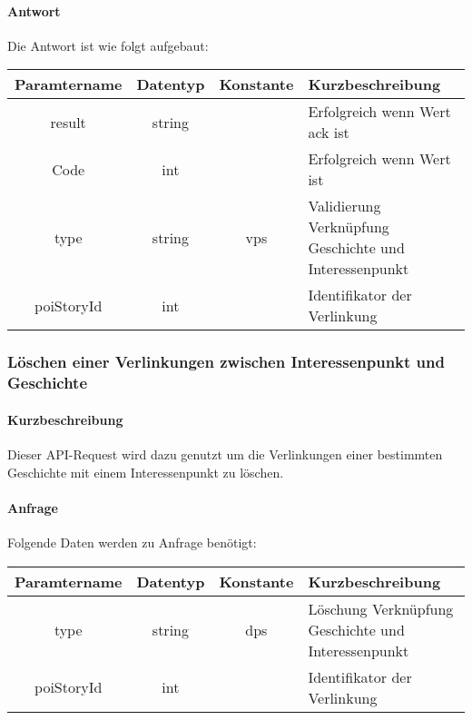 \paragraph{Antwort}Die Antwort ist wie folgt aufgebaut:
\begin{table}[H]
	\begin{tabular}{|c|c|c|p{6.5cm}|}
		\hline
		\textbf{Paramtername} & \textbf{Datentyp} & \textbf{Konstante} & \textbf{Kurzbeschreibung}                                                                                               \\ \hline
		result              & string           &                 & Erfolgreich wenn Wert {\glqq ack\grqq} ist \\ \hline
		Code                & int              &                 & Erfolgreich wenn Wert {\glqq 0\grqq} ist \\ \hline
		type                & string           & vps             & Validierung Verknüpfung Geschichte und Interessenpunkt \\ \hline
		poiStoryId          & int              &                 & Identifikator der Verlinkung \\ \hline
	\end{tabular}
\end{table}
\subsubsection{Löschen einer Verlinkungen zwischen Interessenpunkt und Geschichte}
\paragraph{Kurzbeschreibung}Dieser API-Request wird dazu genutzt um die Verlinkungen einer bestimmten Geschichte mit einem Interessenpunkt zu löschen.
\paragraph{Anfrage}Folgende Daten werden zu Anfrage benötigt:
\begin{table}[H]
	\begin{tabular}{|c|c|c|p{6.5cm}|}
		\hline
		\textbf{Paramtername} & \textbf{Datentyp} & \textbf{Konstante} & \textbf{Kurzbeschreibung}                                                                                               \\ \hline
		type                & string            & dps                & Löschung Verknüpfung Geschichte und Interessenpunkt \\ \hline
		poiStoryId          & int               &                    & Identifikator der Verlinkung \\ \hline
	\end{tabular}
\end{table}
